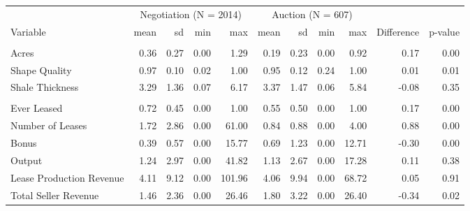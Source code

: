 
\begin{tabular}{lrrrrrrrrrr}
\toprule
\multicolumn{1}{c}{ } & \multicolumn{4}{c}{Negotiation (N = 2014)} & \multicolumn{4}{c}{Auction (N = 607)} \\
\cmidrule(l{3pt}r{3pt}){2-5} \cmidrule(l{3pt}r{3pt}){6-9}
Variable & mean & sd & min & max & mean & sd & min & max & Difference & p-value\\
\midrule
\addlinespace[0.3em]
\multicolumn{11}{l}{\textbf{Land Characteristics}}\\
\hspace{1em}Acres & 0.36 & 0.27 & 0.00 & 1.29 & 0.19 & 0.23 & 0.00 & 0.92 & 0.17 & 0.00\\
\hspace{1em}Shape Quality & 0.97 & 0.10 & 0.02 & 1.00 & 0.95 & 0.12 & 0.24 & 1.00 & 0.01 & 0.01\\
\hspace{1em}Shale Thickness & 3.29 & 1.36 & 0.07 & 6.17 & 3.37 & 1.47 & 0.06 & 5.84 & -0.08 & 0.35\\
\addlinespace[0.3em]
\multicolumn{11}{l}{\textbf{Parcel Outcomes}}\\
\hspace{1em}Ever Leased & 0.72 & 0.45 & 0.00 & 1.00 & 0.55 & 0.50 & 0.00 & 1.00 & 0.17 & 0.00\\
\hspace{1em}Number of Leases & 1.72 & 2.86 & 0.00 & 61.00 & 0.84 & 0.88 & 0.00 & 4.00 & 0.88 & 0.00\\
\hspace{1em}Bonus & 0.39 & 0.57 & 0.00 & 15.77 & 0.69 & 1.23 & 0.00 & 12.71 & -0.30 & 0.00\\
\hspace{1em}Output & 1.24 & 2.97 & 0.00 & 41.82 & 1.13 & 2.67 & 0.00 & 17.28 & 0.11 & 0.38\\
\hspace{1em}Lease Production Revenue & 4.11 & 9.12 & 0.00 & 101.96 & 4.06 & 9.94 & 0.00 & 68.72 & 0.05 & 0.91\\
\hspace{1em}Total Seller Revenue & 1.46 & 2.36 & 0.00 & 26.46 & 1.80 & 3.22 & 0.00 & 26.40 & -0.34 & 0.02\\
\bottomrule
\end{tabular}
